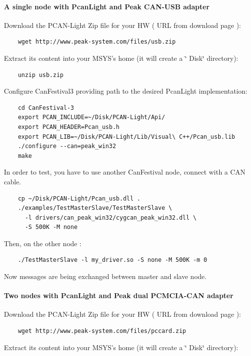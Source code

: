 \documentclass[12pt,english,a4paper]{book}
\begin{document}
\paragraph{A single node with PcanLight and Peak CAN-USB adapter}

Download the PCAN-Light Zip file for your HW ( URL from download page
):

\begin{verbatim}
	wget http://www.peak-system.com/files/usb.zip
\end{verbatim}

Extract its content into your MSYS's home (it will create a \char`\"{}
Disk\char`\"{} directory):


\begin{verbatim}
	unzip usb.zip
\end{verbatim}


Configure CanFestival3 providing path to the desired PcanLight implementation:

\begin{verbatim}
	cd CanFestival-3
	export PCAN_INCLUDE=~/Disk/PCAN-Light/Api/
	export PCAN_HEADER=Pcan_usb.h
	export PCAN_LIB=~/Disk/PCAN-Light/Lib/Visual\ C++/Pcan_usb.lib
	./configure --can=peak_win32
	make
\end{verbatim}

In order to test, you have to use another CanFestival node, connect
with a CAN cable.


\begin{verbatim}
	cp ~/Disk/PCAN-Light/Pcan_usb.dll .
	./examples/TestMasterSlave/TestMasterSlave \
	  -l drivers/can_peak_win32/cygcan_peak_win32.dll \
	  -S 500K -M none
\end{verbatim}

Then, on the other node :

\begin{verbatim}
	./TestMasterSlave -l my_driver.so -S none -M 500K -m 0
\end{verbatim}
Now messages are being exchanged between master and slave node.


\paragraph{Two nodes with PcanLight and Peak dual PCMCIA-CAN adapter}

Download the PCAN-Light Zip file for your HW ( URL from download page
):

\begin{verbatim}
	wget http://www.peak-system.com/files/pccard.zip
\end{verbatim}
Extract its content into your MSYS's home (it will create a \char`\"{}
Disk\char`\"{} directory):
\end{document}
